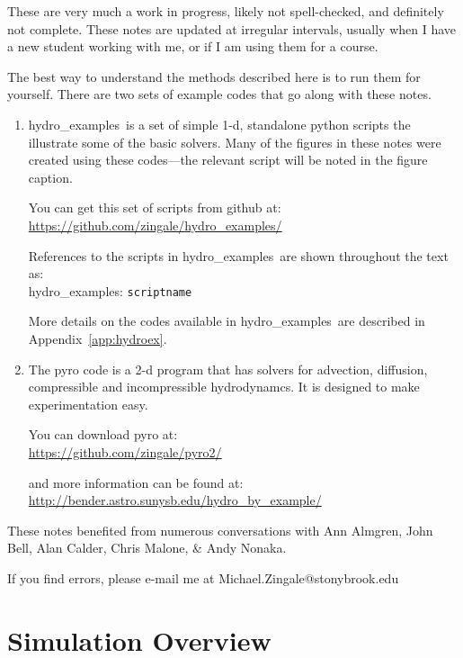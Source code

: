 \documentclass[11pt]{book}
\newcommand{\hydroex}{{\sf hydro\_examples}}
\newcommand{\hydroexdoit}[1]{{\color{red} \LARGE \Keyboard}\/ \hydroex: {\tt #1}}
\begin{document}
These are very much a work in progress, likely not spell-checked, and 
definitely not complete.  These notes are updated at irregular
intervals, usually when I have a new student working with me, or if
I am using them for a course.

The best way to understand the methods described here is to run
them for yourself.  There are two sets of example codes that
go along with these notes.

\begin{enumerate}
\item \hydroex\ is a set of simple 1-d, standalone python scripts
  the illustrate some of the basic solvers.  Many of the figures
  in these notes were created using these codes---the relevant
  script will be noted in the figure caption.  

  You can get this set of scripts from github at:\\
  \url{https://github.com/zingale/hydro_examples/}

  References to the scripts in \hydroex\ are shown throughout
  the text as: \\[0.5em]
  \hydroexdoit{scriptname}

  More details on the codes available in \hydroex\ are described
  in Appendix~\ref{app:hydroex}.

\item  The {\sf pyro} code is a 2-d program that has
  solvers for advection, diffusion, compressible and incompressible
  hydrodynamcs.  It is designed to make 
  experimentation easy.  

  You can download {\sf pyro} at: \\
  \url{https://github.com/zingale/pyro2/} 

  and more information can be found at: \\
\url{http://bender.astro.sunysb.edu/hydro_by_example/}
\end{enumerate}

These notes benefited from numerous conversations with Ann Almgren,
John Bell, Alan Calder, Chris Malone, \& Andy Nonaka.

If you find errors, please e-mail me at Michael.Zingale@stonybrook.edu

\clearpage

\mainmatter


\chapter{Simulation Overview}
\end{document}
